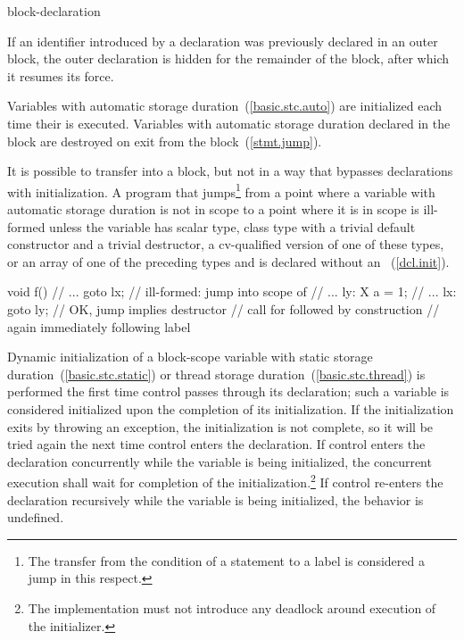 \begin{bnf}
\br
    block-declaration
\end{bnf}

If an identifier introduced by a declaration was previously declared in
an outer block,
%
%
%
the outer declaration is hidden for the remainder of the block, after
which it resumes its force.

\pnum
{}%
%
Variables with automatic storage duration~(\ref{basic.stc.auto}) are
initialized each time their  is executed.
%
Variables with automatic storage duration declared in the block are
destroyed on exit from the block~(\ref{stmt.jump}).

\pnum
{}%
%
It is possible to transfer into a block, but not in a way that bypasses
declarations with initialization. A program that jumps\footnote{The transfer from the condition of a  statement to a
 label is considered a jump in this respect.}
from a point where a variable with automatic storage duration is
not in scope to a point where it is in scope is ill-formed unless the
variable has scalar type, class type with a trivial default constructor and a trivial destructor, a cv-qualified version of one of these types, or an array of one of the preceding types and is declared without an
~(\ref{dcl.init}).
\enterexample

\begin{codeblock}
void f() {
  // ... 
  goto lx;          // ill-formed: jump into scope of 
  // ...
ly:
  X a = 1;
  // ...
lx:
  goto ly;          // OK, jump implies destructor
                    // call for  followed by construction
                    // again immediately following label 
}
\end{codeblock}
\exitexample

\pnum
{}%
%
%
%
Dynamic initialization of a block-scope variable with
static storage duration~(\ref{basic.stc.static}) or
thread storage duration~(\ref{basic.stc.thread}) is performed
the first time control passes through its declaration; such a variable is
considered initialized upon the completion of its initialization. If the
initialization exits by throwing an exception, the initialization is not
complete, so it will be tried again the next time control enters the
declaration. If control enters the declaration concurrently while the variable is being initialized, the concurrent execution shall wait for completion of the initialization.\footnote{The implementation must not introduce any deadlock around execution of the initializer.} If control re-enters the declaration recursively while
the variable is being initialized, the behavior is undefined.
\enterexample

